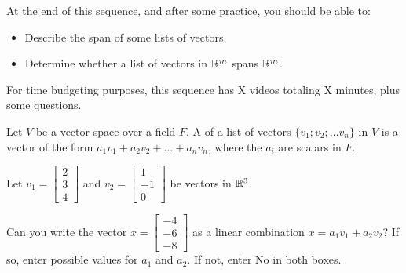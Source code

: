 







At the end of this sequence, and after some practice, you should be able to:

\begin{itemize}
\item Describe the span of some lists of vectors.
\item Determine whether a list of vectors in $\mathbb R^m$ spans $\mathbb R^m$.  
\end{itemize}


For time budgeting purposes, this sequence has X videos totaling X minutes, 
plus some questions.  




\endedxtext

\endedxvertical





Let $V$ be a vector space over a field $F$.  A {} of a list of vectors $\{v_1; v_2; 
\ldots v_n\}$
in $V$ is a vector of the form $a_1v_1 + a_2v_2 + \ldots + a_n v_n$, where the $a_i$ are scalars in $F$.  


\endedxtext


\endedxvertical






Let $v_1 = \left[\begin{array}{c} 2 \\ 3  \\ 4 \end{array} \right]$ and  
$v_2 = \left[\begin{array}{c} 1 \\ -1  \\ 0 \end{array} \right]$ be vectors in $\mathbb R^3$.

Can you write the vector $x  = \left[\begin{array}{c} -4 \\ -6  \\ -8 \end{array} \right]$
as a linear combination $x = a_1 v_1 + a_2 v_2$?  If so, enter possible values for $a_1$ and
$a_2$.  If not, enter No in both boxes.  

